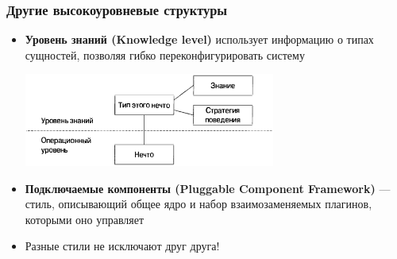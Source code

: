 \documentclass[xetex,mathserif,serif]{beamer}
\begin{document}
	\begin{frame}
		\frametitle{Другие высокоуровневые структуры}
		\begin{itemize}
			\item \textbf{Уровень знаний (Knowledge level)} использует информацию о типах сущностей, позволяя гибко переконфигурировать систему
			\begin{center}
				\includegraphics[width=0.65\textwidth]{knowledgeLevel.png}
			\end{center}
			\item \textbf{Подключаемые компоненты (Pluggable Component Framework)} --- стиль, описывающий общее ядро и набор взаимозаменяемых плагинов, которыми оно управляет
			\item Разные стили не исключают друг друга!
		\end{itemize}
	\end{frame}
\end{document}
